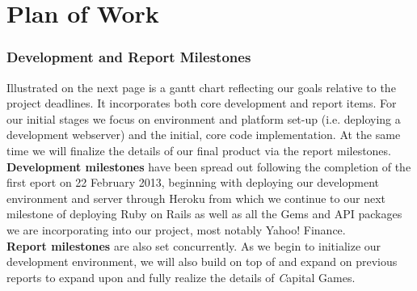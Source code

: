 \chapter{Plan of Work}

\subsection{Development and Report Milestones}

Illustrated on the next page is a gantt chart reflecting our goals relative
to the project deadlines. It incorporates both core development and report items.
For our initial stages we focus on environment and platform set-up (i.e.
deploying a development webserver) and the initial, core code implementation. At
the same time we will finalize the details of our final product via the report
milestones. \\ 

{\bfseries Development milestones} have been spread out following the completion 
of the first eport on 22 February 2013, beginning with deploying our development
 environment and server through Heroku from which we continue to our next 
 milestone of deploying Ruby on Rails as well as all the Gems and API packages we are incorporating into our project, most notably Yahoo! Finance. \\

{\bfseries Report milestones} are also set concurrently. As we begin to initialize
our development environment, we will also build on top of and expand on previous
reports to expand upon and fully realize the details of {\textit Capital Games}. \\



